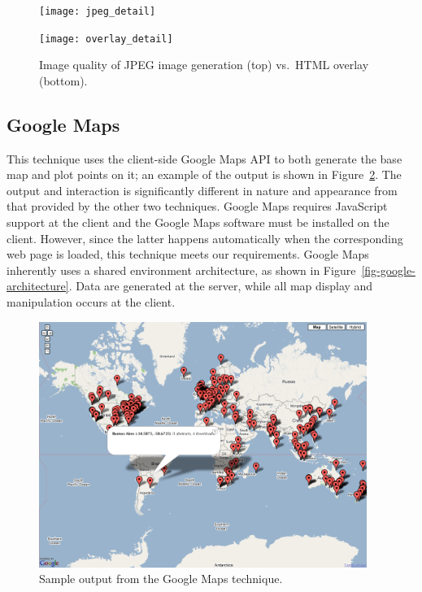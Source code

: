 \documentclass[acmtocl,acmnow]{acmtrans2m}
\begin{document}
\begin{figure}
	\begin{center}
		\texttt{[image: jpeg\_detail]}\medskip
		
		\texttt{[image: overlay\_detail]}
	\end{center}
	\caption{Image quality of JPEG image generation (top) vs.\ HTML
	overlay (bottom).}
	\label{fig-image-quality}
\end{figure}


\subsection{Google Maps}
\label{sec-google}

This technique uses the client-side Google Maps API
\cite{Goog-M-2006-maps} to both generate the base map and plot points on
it; an example of the output is shown in Figure~\ref{fig-google}. The
output and interaction is significantly different in nature and
appearance from that provided by the other two techniques. Google Maps
requires JavaScript support at the client and the Google Maps software
must be installed on the client. However, since the latter happens
automatically when the corresponding web page is loaded, this technique
meets our requirements. Google Maps inherently uses a shared environment
architecture, as shown in Figure~\ref{fig-google-architecture}. Data are
generated at the server, while all map display and manipulation occurs
at the client.


\begin{figure}
	\begin{center}
		\includegraphics[width=0.95\textwidth,keepaspectratio]{GoogleMap-full.png}
	\end{center}
	\caption{Sample output from the Google Maps technique.}
	\label{fig-google}
\end{figure}
\end{document}
